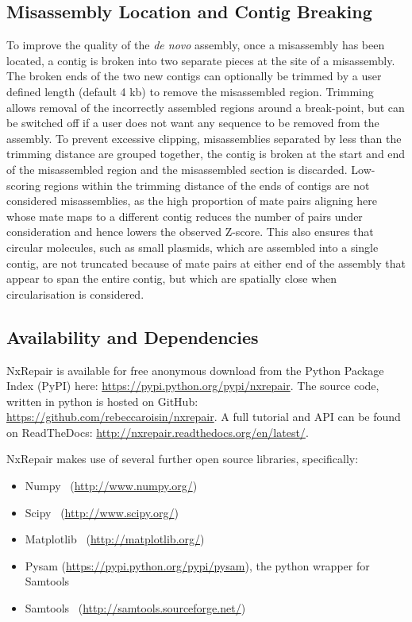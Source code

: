 \subsection{Misassembly Location and Contig Breaking}
To improve the quality of the \textit{de novo} assembly, once a misassembly has been located, a contig is broken into two separate pieces at the site of a misassembly. The broken ends of the two new contigs can optionally be trimmed by a user defined length (default 4 kb) to remove the misassembled region. Trimming allows removal of the incorrectly assembled regions around a break-point, but can be switched off if a user does not want any sequence to be removed from the assembly. To prevent excessive clipping, misassemblies separated by less than the trimming distance are grouped together, the contig is broken at the start and end of the misassembled region and the misassembled section is discarded. Low-scoring regions within the trimming distance of the ends of contigs are not considered misassemblies, as the high proportion of mate pairs aligning here whose mate maps to a different contig reduces the number of pairs under consideration and hence lowers the observed Z-score. This also ensures that circular molecules, such as small plasmids, which are assembled into a single contig, are not truncated because of mate pairs at either end of the assembly that appear to span the entire contig, but which are spatially close when circularisation is considered.

\subsection{Availability and Dependencies}
NxRepair is available for free anonymous download from the Python Package Index (PyPI) here: \url{https://pypi.python.org/pypi/nxrepair}.
The source code, written in python is hosted on GitHub: \url{https://github.com/rebeccaroisin/nxrepair}.
A full tutorial and API can be found on ReadTheDocs: \url{http://nxrepair.readthedocs.org/en/latest/}.

NxRepair makes use of several further open source libraries, specifically:

\begin{itemize}
\item[] Numpy~\cite{numpy} (\url{http://www.numpy.org/})
\item[] Scipy~\cite{scipy} (\url{http://www.scipy.org/})
\item[] Matplotlib~\cite{Hunter2007} (\url{http://matplotlib.org/})
\item[] Pysam (\url{https://pypi.python.org/pypi/pysam}), the python wrapper for Samtools
\item[] Samtools~\cite{li2009} (\url{http://samtools.sourceforge.net/})
\end{itemize}

